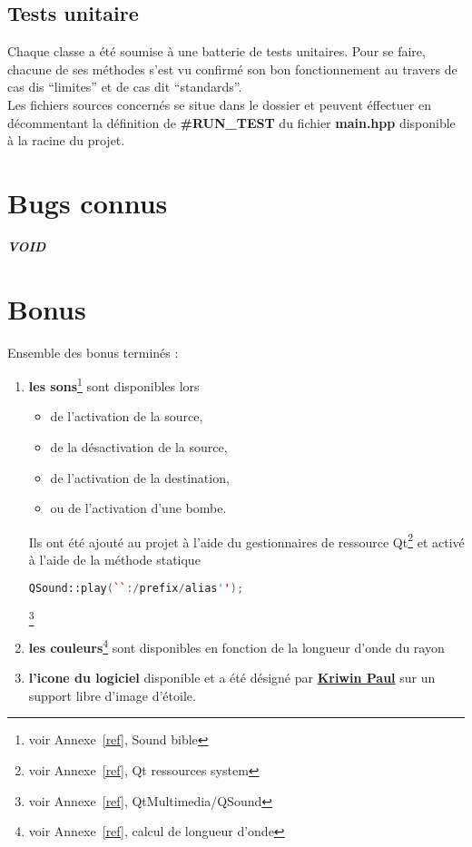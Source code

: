 \documentclass[a4paper,11pt]{report}
\begin{document}
\section{Tests unitaire}
Chaque classe a été soumise à une batterie de tests unitaires. Pour se faire,
chacune de ses méthodes s'est vu confirmé son bon fonctionnement au travers de
cas dis ``limites'' et de cas dit ``standards''. \\

Les fichiers sources concernés se situe dans le dossier  et peuvent
éffectuer en décommentant la définition de \textbf{\#RUN\_TEST} du fichier
\textbf{main.hpp} disponible à la racine du projet.
\chapter{Bugs connus}
\begin{center}
	\textbf{\textit{VOID}}
\end{center}
\newpage
\chapter{Bonus}

Ensemble des bonus terminés :
\begin{enumerate}
	\item \textbf{les sons}\footnote{voir Annexe~\ref{ref}, Sound bible}  sont disponibles lors 
		\begin{itemize}
			\item de l'activation de la source,
			\item de la désactivation de la source,
			\item de l'activation de la destination,
			\item ou de l'activation d'une bombe.
		\end{itemize}
		Ils ont été ajouté au projet à l'aide du gestionnaires de ressource
		Qt\footnote{voir Annexe~\ref{ref}, Qt ressources system} 
		et activé à l'aide de la méthode statique 
		\begin{lstlisting}[language=C++]
QSound::play(``:/prefix/alias'');
		\end{lstlisting}\footnote{voir Annexe~\ref{ref}, QtMultimedia/QSound}
	\item \textbf{les couleurs}\footnote{voir Annexe~\ref{ref}, calcul de longueur d'onde} 
		sont disponibles en fonction de la longueur d'onde du rayon
	\item \textbf{l'icone du logiciel} disponible et a été désigné par
		\href{mailto:39171@heb.be}{\textbf{Kriwin Paul}} sur un support libre d'image d'étoile.
\end{enumerate}
\end{document}
